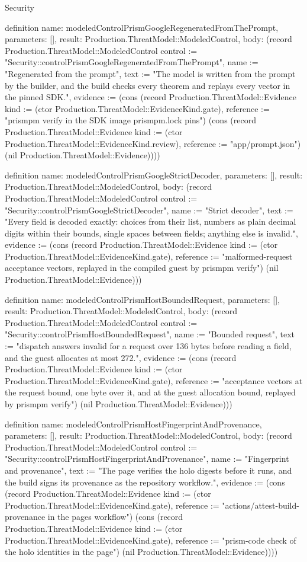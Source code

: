 \begin{lexlean}{Security}
\begin{semanticmodule}
definition{
  name: modeledControlPrismGoogleRegeneratedFromThePrompt,
  parameters: [],
  result: Production.ThreatModel::ModeledControl,
  body: (record Production.ThreatModel::ModeledControl {control := "Security::controlPrismGoogleRegeneratedFromThePrompt", name := "Regenerated from the prompt", text := "The model is written from the prompt by the builder, and the build checks every theorem and replays every vector in the pinned SDK.", evidence := (cons (record Production.ThreatModel::Evidence {kind := (ctor Production.ThreatModel::EvidenceKind.gate), reference := "prismpm verify in the SDK image prismpm.lock pins"}) (cons (record Production.ThreatModel::Evidence {kind := (ctor Production.ThreatModel::EvidenceKind.review), reference := "app/prompt.json"}) (nil Production.ThreatModel::Evidence)))})
}

definition{
  name: modeledControlPrismGoogleStrictDecoder,
  parameters: [],
  result: Production.ThreatModel::ModeledControl,
  body: (record Production.ThreatModel::ModeledControl {control := "Security::controlPrismGoogleStrictDecoder", name := "Strict decoder", text := "Every field is decoded exactly: choices from their list, numbers as plain decimal digits within their bounds, single spaces between fields; anything else is invalid.", evidence := (cons (record Production.ThreatModel::Evidence {kind := (ctor Production.ThreatModel::EvidenceKind.gate), reference := "malformed-request acceptance vectors, replayed in the compiled guest by prismpm verify"}) (nil Production.ThreatModel::Evidence))})
}

definition{
  name: modeledControlPrismHostBoundedRequest,
  parameters: [],
  result: Production.ThreatModel::ModeledControl,
  body: (record Production.ThreatModel::ModeledControl {control := "Security::controlPrismHostBoundedRequest", name := "Bounded request", text := "dispatch answers invalid for a request over 136 bytes before reading a field, and the guest allocates at most 272.", evidence := (cons (record Production.ThreatModel::Evidence {kind := (ctor Production.ThreatModel::EvidenceKind.gate), reference := "acceptance vectors at the request bound, one byte over it, and at the guest allocation bound, replayed by prismpm verify"}) (nil Production.ThreatModel::Evidence))})
}

definition{
  name: modeledControlPrismHostFingerprintAndProvenance,
  parameters: [],
  result: Production.ThreatModel::ModeledControl,
  body: (record Production.ThreatModel::ModeledControl {control := "Security::controlPrismHostFingerprintAndProvenance", name := "Fingerprint and provenance", text := "The page verifies the holo digests before it runs, and the build signs its provenance as the repository workflow.", evidence := (cons (record Production.ThreatModel::Evidence {kind := (ctor Production.ThreatModel::EvidenceKind.gate), reference := "actions/attest-build-provenance in the pages workflow"}) (cons (record Production.ThreatModel::Evidence {kind := (ctor Production.ThreatModel::EvidenceKind.gate), reference := "prism-code check of the holo identities in the page"}) (nil Production.ThreatModel::Evidence)))})
}


\end{semanticmodule}
\end{lexlean}

